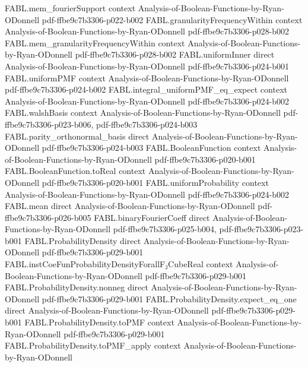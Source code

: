\begin{theorem}
\proofstep
  {FABL.mem_fourierSupport}
  {context}
  {Analysis-of-Boolean-Functions-by-Ryan-ODonnell}
  {pdf-ffbe9c7b3306-p022-b002}
\proofstep
  {FABL.granularityFrequencyWithin}
  {context}
  {Analysis-of-Boolean-Functions-by-Ryan-ODonnell}
  {pdf-ffbe9c7b3306-p028-b002}
\proofstep
  {FABL.mem_granularityFrequencyWithin}
  {context}
  {Analysis-of-Boolean-Functions-by-Ryan-ODonnell}
  {pdf-ffbe9c7b3306-p028-b002}
\proofstep
  {FABL.uniformInner}
  {direct}
  {Analysis-of-Boolean-Functions-by-Ryan-ODonnell}
  {pdf-ffbe9c7b3306-p024-b001}
\proofstep
  {FABL.uniformPMF}
  {context}
  {Analysis-of-Boolean-Functions-by-Ryan-ODonnell}
  {pdf-ffbe9c7b3306-p024-b002}
\proofstep
  {FABL.integral_uniformPMF_eq_expect}
  {context}
  {Analysis-of-Boolean-Functions-by-Ryan-ODonnell}
  {pdf-ffbe9c7b3306-p024-b002}
\proofstep
  {FABL.walshBasis}
  {context}
  {Analysis-of-Boolean-Functions-by-Ryan-ODonnell}
  {pdf-ffbe9c7b3306-p023-b006,
    pdf-ffbe9c7b3306-p024-b003}
\proofstep
  {FABL.parity_orthonormal_basis}
  {direct}
  {Analysis-of-Boolean-Functions-by-Ryan-ODonnell}
  {pdf-ffbe9c7b3306-p024-b003}
\proofstep
  {FABL.BooleanFunction}
  {context}
  {Analysis-of-Boolean-Functions-by-Ryan-ODonnell}
  {pdf-ffbe9c7b3306-p020-b001}
\proofstep
  {FABL.BooleanFunction.toReal}
  {context}
  {Analysis-of-Boolean-Functions-by-Ryan-ODonnell}
  {pdf-ffbe9c7b3306-p020-b001}
\proofstep
  {FABL.uniformProbability}
  {context}
  {Analysis-of-Boolean-Functions-by-Ryan-ODonnell}
  {pdf-ffbe9c7b3306-p024-b002}
\proofstep
  {FABL.mean}
  {direct}
  {Analysis-of-Boolean-Functions-by-Ryan-ODonnell}
  {pdf-ffbe9c7b3306-p026-b005}
\proofstep
  {FABL.binaryFourierCoeff}
  {direct}
  {Analysis-of-Boolean-Functions-by-Ryan-ODonnell}
  {pdf-ffbe9c7b3306-p025-b004,
    pdf-ffbe9c7b3306-p023-b001}
\proofstep
  {FABL.ProbabilityDensity}
  {direct}
  {Analysis-of-Boolean-Functions-by-Ryan-ODonnell}
  {pdf-ffbe9c7b3306-p029-b001}
\proofstep
  {FABL.instCoeFunProbabilityDensityForallF₂CubeReal}
  {context}
  {Analysis-of-Boolean-Functions-by-Ryan-ODonnell}
  {pdf-ffbe9c7b3306-p029-b001}
\proofstep
  {FABL.ProbabilityDensity.nonneg}
  {direct}
  {Analysis-of-Boolean-Functions-by-Ryan-ODonnell}
  {pdf-ffbe9c7b3306-p029-b001}
\proofstep
  {FABL.ProbabilityDensity.expect_eq_one}
  {direct}
  {Analysis-of-Boolean-Functions-by-Ryan-ODonnell}
  {pdf-ffbe9c7b3306-p029-b001}
\proofstep
  {FABL.ProbabilityDensity.toPMF}
  {context}
  {Analysis-of-Boolean-Functions-by-Ryan-ODonnell}
  {pdf-ffbe9c7b3306-p029-b001}
\proofstep
  {FABL.ProbabilityDensity.toPMF_apply}
  {context}
  {Analysis-of-Boolean-Functions-by-Ryan-ODonnell}

\end{theorem}
